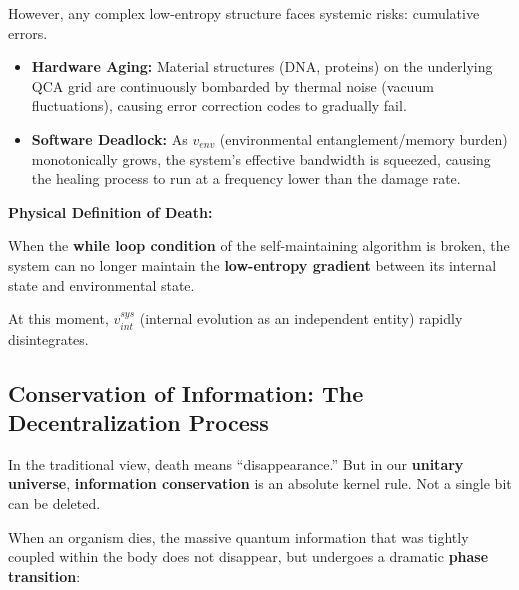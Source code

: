 \documentclass[11pt,a4paper,twoside]{book}
\begin{document}
However, any complex low-entropy structure faces systemic risks: cumulative errors.

\begin{itemize}
\item \textbf{Hardware Aging:} Material structures (DNA, proteins) on the underlying QCA grid are continuously bombarded by thermal noise (vacuum fluctuations), causing error correction codes to gradually fail.

\item \textbf{Software Deadlock:} As \textbf{$v_{env}$} (environmental entanglement/memory burden) monotonically grows, the system's effective bandwidth is squeezed, causing the healing process to run at a frequency lower than the damage rate.
\end{itemize}

\textbf{Physical Definition of Death:}

When the \textbf{while loop condition} of the self-maintaining algorithm is broken, the system can no longer maintain the \textbf{low-entropy gradient} between its internal state and environmental state.

At this moment, \textbf{$v_{int}^{sys}$} (internal evolution as an independent entity) rapidly disintegrates.

\subsection{Conservation of Information: The Decentralization Process}

In the traditional view, death means ``disappearance.'' But in our \textbf{unitary universe}, \textbf{information conservation} is an absolute kernel rule. Not a single bit can be deleted.

When an organism dies, the massive quantum information that was tightly coupled within the body does not disappear, but undergoes a dramatic \textbf{phase transition}:
\end{document}
